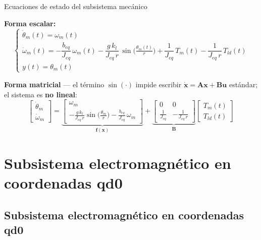 \documentclass[aspectratio=169,t]{beamer}
\newcommand{\SecPresentacion}{Presentación del problema}
\newcommand{\SecMecanico}{Subsistema mecánico equivalente}
\newcommand{\SecElectromagnetico}{Subsistema electromagnético en coordenadas qd0}
\newcommand{\SecTermico}{Subsistema térmico}
\newcommand{\SecNLGlobal}{Sistema No Lineal Global}
\newcommand{\SecLPV}{Linealización Jacobiana (LPV)}
\newcommand{\SecLTI}{Obtención del modelo LTI equivalente}
\newcommand{\SecAnalisisLTI}{Análisis del modelo LTI aumentado}
\newcommand{\SecDinamica}{Respuesta dinámica en dominio del tiempo}
\newcommand{\SecControlador}{Diseño y análisis del controlador en cascada}
\newcommand{\SecVerifSpecs}{Verificación de desempeño: Especificaciones de operación}
\newcommand{\SecVerifOffset}{Verificación de desempeño: Offset de estado estacionario}
\newcommand{\SecVerifNoIdealidades}{Verificación de desempeño: No idealidades y comportamiento térmico}
\newcommand{\SecDiscretizacion}{Discretización del controlador}
\newcommand{\SecSoftware}{Codificación del software de control}
\newcommand{\AgendaItem}[3]{%
  \ifnum#1=#2
    {\scriptsize\bfseries\color{uncBlue}%
      \hyperlink{sec:#1}{\makebox[2.2em][r]{#1.}\hspace{0.7em}%
      \parbox[t]{0.86\textwidth}{#3}}\par}%
  \else
    {\scriptsize\color{black!26}%
      \hyperlink{sec:#1}{\makebox[2.2em][r]{#1.}\hspace{0.7em}%
      \parbox[t]{0.86\textwidth}{#3}}\par}%
  \fi
  \vspace{0.35mm}%
}
\newcommand{\AgendaBody}[1]{%
    \vspace{3mm}
    {\Large\bfseries\color{uncBlue}Tabla de contenidos\par}
    \vspace{2mm}
    \begin{minipage}{0.94\textwidth}
      \AgendaItem{1}{#1}{\SecPresentacion}
      \AgendaItem{2}{#1}{\SecMecanico}
      \AgendaItem{3}{#1}{\SecElectromagnetico}
      \AgendaItem{4}{#1}{\SecTermico}
      \AgendaItem{5}{#1}\SecNLGlobal
      \AgendaItem{6}{#1}{\SecLPV}
      \AgendaItem{7}{#1}{\SecLTI}
      \AgendaItem{8}{#1}{\SecAnalisisLTI}
      \AgendaItem{9}{#1}{\SecDinamica}
      \AgendaItem{10}{#1}{\SecControlador}
      \AgendaItem{11}{#1}{\SecVerifSpecs}
      \AgendaItem{12}{#1}{\SecVerifOffset}
      \AgendaItem{13}{#1}{\SecVerifNoIdealidades}
      \AgendaItem{14}{#1}{\SecDiscretizacion}
      \AgendaItem{15}{#1}{\SecSoftware}
    \end{minipage}
    \vfill
}
\newcommand{\AgendaSlideTarget}[2]{%
  \begin{frame}[plain]
    \hypertarget{#2}{}%
    \AgendaBody{#1}
  \end{frame}
}
\newcommand{\StartProjectSection}[2]{%
  \section{#2}%
  \subsection{#2}%
  \AgendaSlideTarget{#1}{sec:#1}%
}
\begin{document}
\begin{frame}{Ecuaciones de estado del subsistema mecánico}
\vspace{2mm}

\textbf{Forma escalar:}
\begin{equation*}
\begin{cases}
\dot{\theta}_m(t) = \omega_m(t) \\[4pt]
\dot{\omega}_m(t) = -\dfrac{b_{eq}}{J_{eq}}\,\omega_m(t) -\dfrac{g\,k_l}{J_{eq}\,r}\,\sin\!\big(\tfrac{\theta_m(t)}{r}\big) +\dfrac{1}{J_{eq}}\,T_m(t) -\dfrac{1}{J_{eq}\,r}\,T_{ld}(t) \\[6pt]
y(t) = \theta_m(t)
\end{cases}
\end{equation*}

\vspace{2mm}
\textbf{Forma matricial} --- el término $\sin(\cdot)$ impide escribir $\dot{\bm{x}}=\bm{A}\bm{x}+\bm{B}\bm{u}$ estándar; el sistema es \textbf{no lineal}:
\begin{equation*}
\begin{bmatrix}\dot{\theta}_m \\ \dot{\omega}_m\end{bmatrix} =
\underbrace{\begin{bmatrix}\omega_m \\[2pt] -\tfrac{g\,k_l}{J_{eq}\,r}\sin\!\big(\tfrac{\theta_m}{r}\big) -\tfrac{b_{eq}}{J_{eq}}\,\omega_m\end{bmatrix}}_{\bm{f}(\bm{x})}
+
\underbrace{\begin{bmatrix}0 & 0 \\[2pt] \tfrac{1}{J_{eq}} & -\tfrac{1}{J_{eq}\,r}\end{bmatrix}}_{\bm{B}}
\begin{bmatrix}T_m(t) \\ T_{ld}(t)\end{bmatrix}
\end{equation*}
\end{frame}


\StartProjectSection{3}{\SecElectromagnetico}
\end{document}
